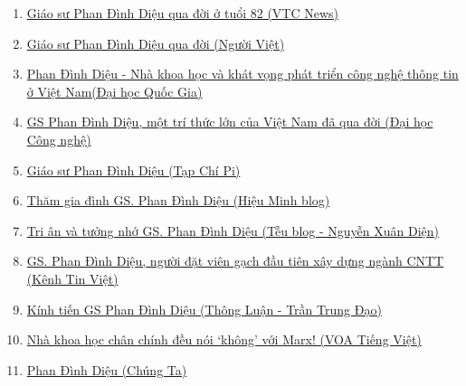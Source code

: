 \begin{enumerate}
\item \href{https://vtc.vn/giao-su-phan-dinh-dieu-qua-doi-o-tuoi-82-ar398883.html}{Giáo sư Phan Đình Diệu qua đời ở tuổi 82 (VTC News)}

\item \href{https://www.nguoi-viet.com/viet-nam/giao-su-phan-dinh-dieu-qua-doi/}{Giáo sư Phan Đình Diệu qua đời (Người Việt)}



\item \href{http://100years.vnu.edu.vn/BTDHQGHN/Vietnamese/C1778/C1779/2006/05/N7716/}{Phan Đình Diệu - Nhà khoa học và khát vọng phát triển công nghệ thông tin ở Việt Nam(Đại học Quốc Gia)}


\item \href{https://uet.vnu.edu.vn/gs-phan-dinh-dieu-mot-tri-thuc-lon-cua-viet-nam-da-qua-doi/}{GS Phan Đình Diệu, một trí thức lớn của Việt Nam đã qua đời (Đại học Công nghệ)}



\item \href{https://pi.edu.vn/detail-news/giao-su-phan-dinh-dieu-144.html}{Giáo sư Phan Đình Diệu (Tạp Chí Pi)}


\item \href{https://hieuminh.wordpress.com/2016/08/27/tham-gia-dinh-gs-phan-dinh-dieu/}{Thăm gia đình GS. Phan Đình Diệu (Hiệu Minh blog)}



\item \href{https://xuandienhannom.blogspot.com/2018/05/tri-va-tuong-nho-giao-su-phan-inh-dieu.html}{Tri ân và tưởng nhớ GS. Phan Đình Diệu (Tễu blog - Nguyễn Xuân Diện)}


\item \href{https://kenhtinviet.com/gs-phan-dinh-dieu-nguoi-dat-vien-gach-dau-tien-xay/}{GS. Phan Đình Diệu, người đặt viên gạch đầu tiên xây dựng ngành CNTT (Kênh Tin Việt)}

\item \href{https://ethongluan.org/index.php/doc-bai-luu-tru/1495-kinh-ti-n-gs-phan-dinh-di-u-1936-2018-tr-n-trung-d-o}{Kính tiến GS Phan Đình Diệu (Thông Luận - Trần Trung Đạo)}

\item \href{https://www.voatiengviet.com/a/phan-dinh-dieu-toan-hoc-may-tinh-qua-doi/4398647.html}{Nhà khoa học chân chính đều nói ‘không’ với Marx! (VOA Tiếng Việt)}

\item \href{https://www.chungta.com/nd/nhan-vat-xa-hoi/phan_dinh_dieu.html}{Phan Đình Diệu (Chúng Ta)}



\end{enumerate}